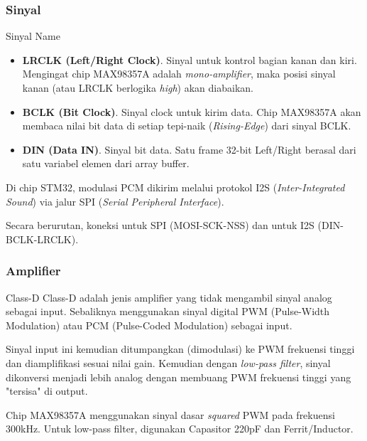 \documentclass[table,dvipsnames,10pt]{beamer}
\begin{document}
	\begin{frame}
	\frametitle{Sinyal}
	\begin{exampleblock}{Sinyal Name}
	\begin{itemize}
		\item \textbf{LRCLK (Left/Right Clock)}. Sinyal untuk kontrol bagian kanan dan kiri.
		Mengingat chip MAX98357A adalah \textit{mono-amplifier},
		maka posisi sinyal kanan (atau LRCLK berlogika \textit{high}) akan diabaikan.
		
		\item \textbf{BCLK (Bit Clock)}. Sinyal clock untuk kirim data.
		Chip MAX98357A akan membaca nilai bit data di setiap tepi-naik (\textit{Rising-Edge})
		dari sinyal BCLK.
		
		\item \textbf{DIN (Data IN)}. Sinyal bit data.
		Satu frame 32-bit Left/Right berasal dari satu variabel elemen dari array buffer.
	\end{itemize}
	\end{exampleblock}
	\begin{exampleblock}{}
			Di chip STM32, modulasi PCM dikirim melalui protokol I2S (\textit{Inter-Integrated Sound})
			via jalur SPI (\textit{Serial Peripheral Interface}).
	\end{exampleblock}
	\begin{exampleblock}{}		
			Secara berurutan, koneksi untuk SPI (MOSI-SCK-NSS) dan untuk I2S (DIN-BCLK-LRCLK).
	\end{exampleblock}	
	\end{frame}

	\begin{frame}
	\frametitle{Amplifier}
	\begin{exampleblock}{Class-D} 
		Class-D adalah jenis amplifier yang tidak mengambil sinyal analog sebagai input.
		Sebaliknya menggunakan sinyal digital PWM (Pulse-Width Modulation) atau PCM (Pulse-Coded Modulation) sebagai input.
	\end{exampleblock}
	\begin{exampleblock}{}
		Sinyal input ini kemudian ditumpangkan (dimodulasi) ke PWM frekuensi tinggi dan diamplifikasi sesuai nilai gain.
		Kemudian dengan \textit{low-pass filter}, sinyal dikonversi menjadi lebih analog
		dengan membuang PWM frekuensi tinggi yang "tersisa" di output.
	\end{exampleblock}
	\begin{exampleblock}{}
		Chip MAX98357A menggunakan sinyal dasar \textit{squared} PWM pada frekuensi 300kHz.
		Untuk low-pass filter, digunakan Capasitor 220pF dan Ferrit/Inductor.
	\end{exampleblock}
	\end{frame}
\end{document}
